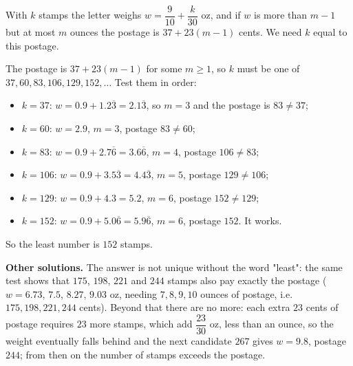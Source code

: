 With $k$ stamps the letter weighs $w=\dfrac{9}{10}+\dfrac{k}{30}$ oz, and if $w$ is more than $m-1$ but at most $m$ ounces the postage is $37+23(m-1)$ cents. We need $k$ equal to this postage.

The postage is $37+23(m-1)$ for some $m\ge1$, so $k$ must be one of $37,60,83,106,129,152,\dots$ Test them in order:
\begin{itemize}
\item $k=37$: $w=0.9+1.2\overline{3}=2.1\overline{3}$, so $m=3$ and the postage is $83\ne37$;
\item $k=60$: $w=2.9$, $m=3$, postage $83\ne60$;
\item $k=83$: $w=0.9+2.7\overline{6}=3.6\overline{6}$, $m=4$, postage $106\ne83$;
\item $k=106$: $w=0.9+3.5\overline{3}=4.4\overline{3}$, $m=5$, postage $129\ne106$;
\item $k=129$: $w=0.9+4.3=5.2$, $m=6$, postage $152\ne129$;
\item $k=152$: $w=0.9+5.0\overline{6}=5.9\overline{6}$, $m=6$, postage $152$. It works.
\end{itemize}
So the least number is $\boxed{152}$ stamps.

\textbf{Other solutions.} The answer is not unique without the word "least": the same test shows that $175$, $198$, $221$ and $244$ stamps also pay exactly the postage ($w=6.73$, $7.5$, $8.27$, $9.03$ oz, needing $7,8,9,10$ ounces of postage, i.e.\ $175,198,221,244$ cents). Beyond that there are no more: each extra $23$ cents of postage requires $23$ more stamps, which add $\dfrac{23}{30}$ oz, less than an ounce, so the weight eventually falls behind and the next candidate $267$ gives $w=9.8$, postage $244$; from then on the number of stamps exceeds the postage.
